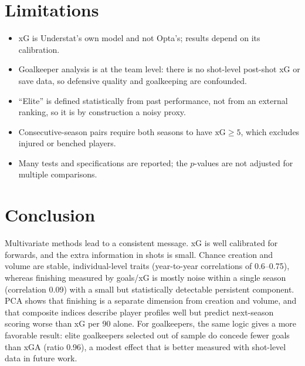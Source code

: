 \documentclass[11pt,a4paper]{article}
\begin{document}


\section{Limitations}

\begin{itemize}
\item xG is Understat's own model and not Opta's; results depend on its calibration.
\item Goalkeeper analysis is at the team level: there is no shot-level post-shot xG or save data, so defensive quality and goalkeeping are confounded.
\item ``Elite'' is defined statistically from past performance, not from an external ranking, so it is by construction a noisy proxy.
\item Consecutive-season pairs require both seasons to have $\text{xG}\geq 5$, which excludes injured or benched players.
\item Many tests and specifications are reported; the $p$-values are not adjusted for multiple comparisons.
\end{itemize}

\section{Conclusion}

Multivariate methods lead to a consistent message. xG is well calibrated for forwards, and the extra information in shots is small. Chance creation and volume are stable, individual-level traits (year-to-year correlations of 0.6--0.75), whereas finishing measured by goals/xG is mostly noise within a single season (correlation 0.09) with a small but statistically detectable persistent component. PCA shows that finishing is a separate dimension from creation and volume, and that composite indices describe player profiles well but predict next-season scoring worse than xG per 90 alone. For goalkeepers, the same logic gives a more favorable result: elite goalkeepers selected out of sample do concede fewer goals than xGA (ratio 0.96), a modest effect that is better measured with shot-level data in future work.
\end{document}
